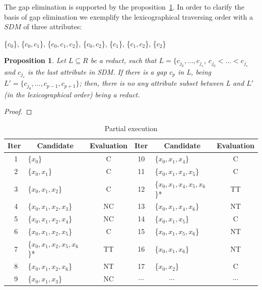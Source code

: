 \documentclass[authoryear,11pt]{elsarticle}
\newtheorem{proposition}{Proposition}
\newtheorem{proof}{Proof}
\begin{document}
	The gap elimination is supported by the proposition~\ref{prop:gap}. In order to clarify the basis of gap
	elimination we exemplify the lexicographical traversing order with a $SDM$ of three attributes:
	
	\{$c_0$\}, \{$c_0,c_1$\}, \{$c_0,c_1,c_2$\}, \{$c_0,c_2$\}, \{$c_1$\}, \{$c_1,c_2$\}, \{$c_2$\}
		
	\begin{proposition}\label{prop:gap} 
		Let $L \subseteq R$ be a reduct, such that $L = \lbrace c_{j_0},...,c_{j_s}$, $c_{j_0}<...<c_{j_s}$
		and $c_{j_s}$ is the last attribute in SDM. If there is a gap $c_p$ in L, being $L' = \lbrace
		c_{j_0},...,c_{p-1},c_{p+1}\rbrace$; then, there is no any attribute subset between L and $L'$ (in the
		lexicographical order) being a reduct.
	\end{proposition}	
	
	\begin{proof}
		
	\end{proof}
	
	\begin{table}[!htb]
		\caption{Partial execution}\label{tab:patial}
      	\centering
    		\begin{tabular}{|c|lc|c|lc|}
    		\hline
    		Iter & \multicolumn{1}{c}{Candidate} & \multicolumn{1}{c|}{Evaluation}
    		& Iter & \multicolumn{1}{c}{Candidate} & \multicolumn{1}{c|}{Evaluation}\\
    		\hline
    		~1 & \{$x_0$\} 	 				& C		& 10 & \{$x_0,x_1,x_4$\} 			& C \\	
    		~2 & \{$x_0,x_1$\}				& C 		& 11 & \{$x_0,x_1,x_4,x_5$\}		& C \\
    		~3 & \{$x_0,x_1,x_2$\} 			& C  	& 12 & \{$x_0,x_1,x_4,x_5,x_6$\}*	& TT \\
    		~4 & \{$x_0,x_1,x_2,x_3$\}		& NC 	& 13 & \cellcolor[gray]{0.9}\{$x_0,x_1,x_4,x_6$\}	& NT	 \\
    		~5 & \{$x_0,x_1,x_2,x_4$\}		& NC 	& 14 & \cellcolor[gray]{0.9}\{$x_0,x_1,x_5$\}		& C \\
    		~6 & \{$x_0,x_1,x_2,x_5$\} 		& C		& 15 & \cellcolor[gray]{0.9}\{$x_0,x_1,x_5,x_6$\} & NT \\
    		~7 & \{$x_0,x_1,x_2,x_5,x_6$\}*	& TT 	& 16 & \cellcolor[gray]{0.9}\{$x_0,x_1,x_6$\}	& NT \\
    		~8 & \cellcolor[gray]{0.9}\{$x_0,x_1,x_2,x_6$\} 		& NT	 	& 17 & \{$x_0,x_2$\}			& C \\
    		~9 & \{$x_0,x_1,x_3$\}			& NC 	&$\cdots$& ~~~~$\cdots$		& $\cdots$\\
    		\hline
		\end{tabular}
	\end{table}
\end{document}
